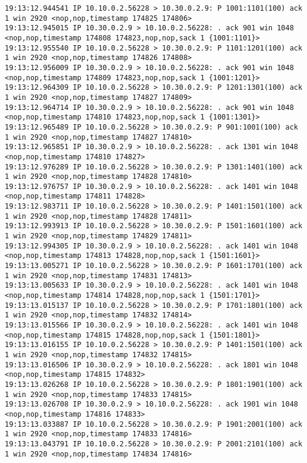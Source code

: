 \documentclass[a4paper,12pt]{article}
\begin{document}
\begin{lstlisting}
19:13:12.944541 IP 10.10.0.2.56228 > 10.30.0.2.9: P 1001:1101(100) ack 1 win 2920 <nop,nop,timestamp 174825 174806>
19:13:12.945015 IP 10.30.0.2.9 > 10.10.0.2.56228: . ack 901 win 1048 <nop,nop,timestamp 174808 174823,nop,nop,sack 1 {1001:1101}>
19:13:12.955540 IP 10.10.0.2.56228 > 10.30.0.2.9: P 1101:1201(100) ack 1 win 2920 <nop,nop,timestamp 174826 174808>
19:13:12.956009 IP 10.30.0.2.9 > 10.10.0.2.56228: . ack 901 win 1048 <nop,nop,timestamp 174809 174823,nop,nop,sack 1 {1001:1201}>
19:13:12.964309 IP 10.10.0.2.56228 > 10.30.0.2.9: P 1201:1301(100) ack 1 win 2920 <nop,nop,timestamp 174827 174809>
19:13:12.964714 IP 10.30.0.2.9 > 10.10.0.2.56228: . ack 901 win 1048 <nop,nop,timestamp 174810 174823,nop,nop,sack 1 {1001:1301}>
19:13:12.965489 IP 10.10.0.2.56228 > 10.30.0.2.9: P 901:1001(100) ack 1 win 2920 <nop,nop,timestamp 174827 174810>
19:13:12.965851 IP 10.30.0.2.9 > 10.10.0.2.56228: . ack 1301 win 1048 <nop,nop,timestamp 174810 174827>
19:13:12.976289 IP 10.10.0.2.56228 > 10.30.0.2.9: P 1301:1401(100) ack 1 win 2920 <nop,nop,timestamp 174828 174810>
19:13:12.976757 IP 10.30.0.2.9 > 10.10.0.2.56228: . ack 1401 win 1048 <nop,nop,timestamp 174811 174828>
19:13:12.983711 IP 10.10.0.2.56228 > 10.30.0.2.9: P 1401:1501(100) ack 1 win 2920 <nop,nop,timestamp 174828 174811>
19:13:12.993913 IP 10.10.0.2.56228 > 10.30.0.2.9: P 1501:1601(100) ack 1 win 2920 <nop,nop,timestamp 174829 174811>
19:13:12.994305 IP 10.30.0.2.9 > 10.10.0.2.56228: . ack 1401 win 1048 <nop,nop,timestamp 174813 174828,nop,nop,sack 1 {1501:1601}>
19:13:13.005271 IP 10.10.0.2.56228 > 10.30.0.2.9: P 1601:1701(100) ack 1 win 2920 <nop,nop,timestamp 174831 174813>
19:13:13.005633 IP 10.30.0.2.9 > 10.10.0.2.56228: . ack 1401 win 1048 <nop,nop,timestamp 174814 174828,nop,nop,sack 1 {1501:1701}>
19:13:13.015137 IP 10.10.0.2.56228 > 10.30.0.2.9: P 1701:1801(100) ack 1 win 2920 <nop,nop,timestamp 174832 174814>
19:13:13.015566 IP 10.30.0.2.9 > 10.10.0.2.56228: . ack 1401 win 1048 <nop,nop,timestamp 174815 174828,nop,nop,sack 1 {1501:1801}>
19:13:13.016155 IP 10.10.0.2.56228 > 10.30.0.2.9: P 1401:1501(100) ack 1 win 2920 <nop,nop,timestamp 174832 174815>
19:13:13.016506 IP 10.30.0.2.9 > 10.10.0.2.56228: . ack 1801 win 1048 <nop,nop,timestamp 174815 174832>
19:13:13.026268 IP 10.10.0.2.56228 > 10.30.0.2.9: P 1801:1901(100) ack 1 win 2920 <nop,nop,timestamp 174833 174815>
19:13:13.026708 IP 10.30.0.2.9 > 10.10.0.2.56228: . ack 1901 win 1048 <nop,nop,timestamp 174816 174833>
19:13:13.033887 IP 10.10.0.2.56228 > 10.30.0.2.9: P 1901:2001(100) ack 1 win 2920 <nop,nop,timestamp 174833 174816>
19:13:13.043791 IP 10.10.0.2.56228 > 10.30.0.2.9: P 2001:2101(100) ack 1 win 2920 <nop,nop,timestamp 174834 174816>

\end{lstlisting}
\end{document}
